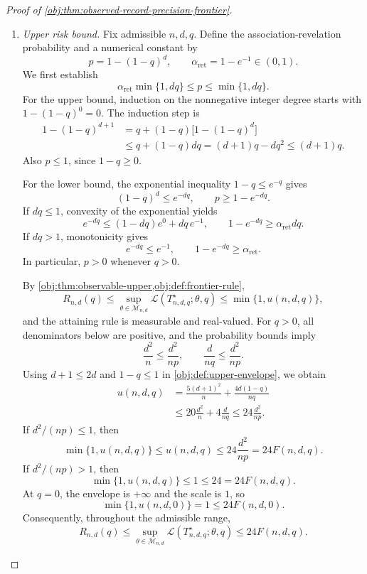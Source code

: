 \begin{proof}[Proof of \cref{obj:thm:observed-record-precision-frontier}]
\begin{enumerate}
\item \textit{Upper risk bound.}
Fix admissible \(n,d,q\). Define the association-revelation probability and a numerical constant by
\[
p=1-(1-q)^d,
\qquad
\alpha_{\mathrm{ret}}=1-e^{-1}\in(0,1).
\]
We first establish
\[
\alpha_{\mathrm{ret}}\min\{1,dq\}\le p\le\min\{1,dq\}.
\]
For the upper bound, induction on the nonnegative integer degree starts with
\(1-(1-q)^0=0\). The induction step is
\[
\begin{aligned}
1-(1-q)^{d+1}
&=q+(1-q)\bigl[1-(1-q)^d\bigr]\\
&\le q+(1-q)dq
=(d+1)q-dq^2
\le(d+1)q.
\end{aligned}
\]
Also \(p\le1\), since \(1-q\ge0\).

For the lower bound, the exponential inequality \(1-q\le e^{-q}\) gives
\[
(1-q)^d\le e^{-dq},
\qquad
p\ge1-e^{-dq}.
\]
If \(dq\le1\), convexity of the exponential yields
\[
e^{-dq}\le(1-dq)e^0+dq\,e^{-1},
\qquad
1-e^{-dq}\ge\alpha_{\mathrm{ret}}dq.
\]
If \(dq>1\), monotonicity gives
\[
e^{-dq}\le e^{-1},
\qquad
1-e^{-dq}\ge\alpha_{\mathrm{ret}}.
\]
In particular, \(p>0\) whenever \(q>0\).

By \cref{obj:thm:observable-upper,obj:def:frontier-rule},
\[
R_{n,d}(q)
\le
\sup_{\theta\in\mathcal M_{n,d}}
\mathcal L(T^\star_{n,d,q};\theta,q)
\le\min\{1,u(n,d,q)\},
\]
and the attaining rule is measurable and real-valued. For \(q>0\), all denominators below are positive, and the probability bounds imply
\[
\frac{d^2}{n}\le\frac{d^2}{np},
\qquad
\frac{d}{nq}\le\frac{d^2}{np}.
\]
Using \(d+1\le2d\) and \(1-q\le1\) in
\cref{obj:def:upper-envelope}, we obtain
\[
\begin{aligned}
u(n,d,q)
&=\frac{5(d+1)^2}{n}+\frac{4d(1-q)}{nq}\\
&\le20\frac{d^2}{n}+4\frac{d}{nq}
\le24\frac{d^2}{np}.
\end{aligned}
\]
If \(d^2/(np)\le1\), then
\[
\min\{1,u(n,d,q)\}
\le u(n,d,q)
\le24\frac{d^2}{np}
=24F(n,d,q).
\]
If \(d^2/(np)>1\), then
\[
\min\{1,u(n,d,q)\}\le1\le24=24F(n,d,q).
\]
At \(q=0\), the envelope is \(+\infty\) and the scale is \(1\), so
\[
\min\{1,u(n,d,0)\}=1\le24F(n,d,0).
\]
Consequently, throughout the admissible range,
\[
R_{n,d}(q)
\le
\sup_{\theta\in\mathcal M_{n,d}}
\mathcal L(T^\star_{n,d,q};\theta,q)
\le24F(n,d,q).
\]


\end{enumerate}
\end{proof}
